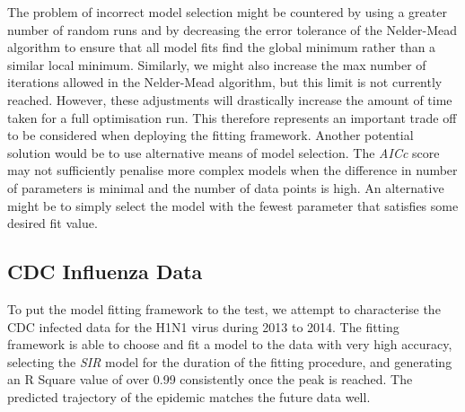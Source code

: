 The problem of incorrect model selection might be countered
by using a greater number of random runs and by decreasing the error
tolerance of the Nelder-Mead algorithm to ensure that all model fits
find the global minimum rather than a similar local
minimum. Similarly, we might also increase the max number of
iterations allowed in the Nelder-Mead algorithm, but this limit is
not currently reached. However, these adjustments will drastically increase the amount of time taken for a full optimisation
run. This therefore represents an important trade off to be considered when deploying
the fitting framework. Another potential solution would be to use
alternative means of model selection. The \emph{AICc} score may not
sufficiently penalise more complex models when the difference in
number of parameters is minimal and the number of data points is
high. An alternative might be to simply select the model with the
fewest parameter that satisfies some desired fit value.


\subsection{CDC Influenza Data}
To put the model fitting framework to the test, we attempt to
characterise the CDC infected data for the H1N1 virus during 2013 to
2014. The fitting framework is able to choose and fit a model to the
data with very high accuracy, selecting the \emph{SIR} model for the
duration of the fitting procedure, and generating an R Square value of
over 0.99 consistently once the peak is reached. The predicted
trajectory of the epidemic matches the future data well.

